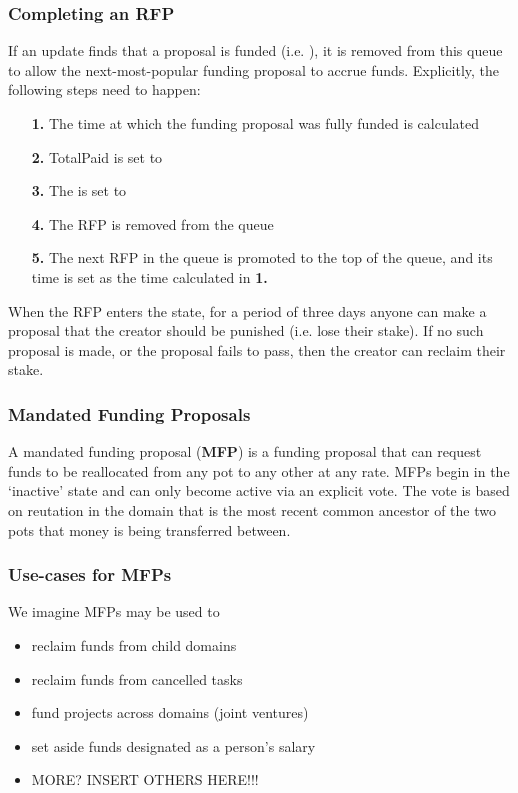 \subsubsection*{Completing an RFP}
If an update finds that a proposal is funded (i.e. ), it is removed from this queue to allow the next-most-popular funding proposal to accrue funds. Explicitly, the following steps need to happen:
\begin{itemize}
 \item[\textbf{1.}] The time at which the funding proposal was fully funded is calculated
 \item[\textbf{2.}] TotalPaid is set to 
 \item[\textbf{3.}] The  is set to 
 \item[\textbf{4.}] The RFP is removed from the queue
 \item[\textbf{5.}] The next RFP in the queue is promoted to the top of the queue, and its  time is set as the time calculated in \textbf{1.}
\end{itemize}


When the RFP enters the  state, for a period of three days anyone can make a proposal that the creator should be punished (i.e. lose their stake). If no such proposal is made, or the proposal fails to pass, then the creator can reclaim their stake.




\subsubsection{Mandated Funding Proposals}
A mandated funding proposal (\textbf{MFP}) is a funding proposal that can request funds to be reallocated from any pot to any other at any rate. MFPs begin in the `inactive' state and can only become active via an explicit vote. The vote is based on reutation in the domain that is the most recent common ancestor of the two pots that money is being transferred between.

\subsubsection*{Use-cases for MFPs}
We imagine MFPs may be used to
\begin{itemize}
 \item reclaim funds from child domains
 \item reclaim funds from cancelled tasks
 \item fund projects across domains (joint ventures)
 \item set aside funds designated as a person's salary
 \item MORE? INSERT OTHERS HERE!!!
\end{itemize}


